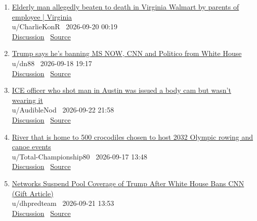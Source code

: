 \documentclass[11pt,a4paper]{article}
\begin{document}
\begin{enumerate}
  \item \href{https://www.reddit.com/r/news/comments/1wl21xy/elderly_man_allegedly_beaten_to_death_in_virginia/}{Elderly man allegedly beaten to death in Virginia Walmart by parents of employee | Virginia}\\ {\small u/CharlieKonR \textbullet\ 2026-09-20 00:19}\\ {\small \href{https://www.reddit.com/r/news/comments/1wl21xy/elderly_man_allegedly_beaten_to_death_in_virginia/}{Discussion} \textbullet\ \href{https://www.theguardian.com/us-news/2026/sep/19/elderly-man-beaten-to-death-virginia-walmart}{Source}}
  \item \href{https://www.reddit.com/r/news/comments/1wjzllf/trump_says_hes_banning_ms_now_cnn_and_politico/}{Trump says he's banning MS NOW, CNN and Politico from White House}\\ {\small u/dn88 \textbullet\ 2026-09-18 19:17}\\ {\small \href{https://www.reddit.com/r/news/comments/1wjzllf/trump_says_hes_banning_ms_now_cnn_and_politico/}{Discussion} \textbullet\ \href{https://www.cnbc.com/2026/09/18/trump-white-house-ban-msnow-cnn-politico.html}{Source}}
  \item \href{https://www.reddit.com/r/news/comments/1wnndel/ice_officer_who_shot_man_in_austin_was_issued_a/}{ICE officer who shot man in Austin was issued a body cam but wasn't wearing it}\\ {\small u/AudibleNod \textbullet\ 2026-09-22 21:58}\\ {\small \href{https://www.reddit.com/r/news/comments/1wnndel/ice_officer_who_shot_man_in_austin_was_issued_a/}{Discussion} \textbullet\ \href{https://www.nbcnews.com/news/us-news/ice-officer-shot-man-austin-wasnt-wearing-body-camera-rcna599263}{Source}}
  \item \href{https://www.reddit.com/r/news/comments/1wiui9l/river_that_is_home_to_500_crocodiles_chosen_to/}{River that is home to 500 crocodiles chosen to host 2032 Olympic rowing and canoe events}\\ {\small u/Total-Championship80 \textbullet\ 2026-09-17 13:48}\\ {\small \href{https://www.reddit.com/r/news/comments/1wiui9l/river_that_is_home_to_500_crocodiles_chosen_to/}{Discussion} \textbullet\ \href{https://www.bbc.co.uk/sport/olympics/articles/cqvgy1m9z4k8o}{Source}}
  \item \href{https://www.reddit.com/r/news/comments/1wmdg5n/networks_suspend_pool_coverage_of_trump_after/}{Networks Suspend Pool Coverage of Trump After White House Bans CNN (Gift Article)}\\ {\small u/dhpredteam \textbullet\ 2026-09-21 13:53}\\ {\small \href{https://www.reddit.com/r/news/comments/1wmdg5n/networks_suspend_pool_coverage_of_trump_after/}{Discussion} \textbullet\ \href{https://www.nytimes.com/2026/09/21/business/media/cnn-trump-press-pool-ban.html?unlocked_article_code=1.C1E.w_1W.pKuLQn94C0Z2&smid=nytcore-ios-share}{Source}}

\end{enumerate}
\end{document}
